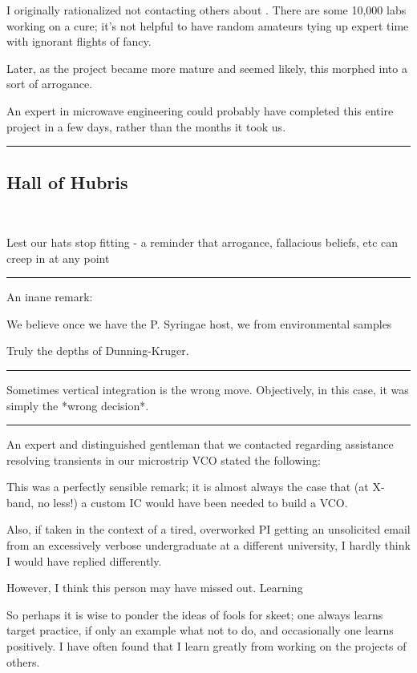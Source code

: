 \documentclass[paper.tex]{subfiles}
\begin{document}
I originally rationalized not contacting others about . There are some 10,000 labs working on a cure; it's not helpful to have random amateurs tying up expert time with ignorant flights of fancy. 

Later, as the project became more mature and seemed likely, this morphed into a sort of arrogance.

An expert in microwave engineering could probably have completed this entire project in a few days, rather than the months it took us.

\rule{\linewidth}{0.2pt}

\subsection{Hall of Hubris} \

Lest our hats stop fitting - a reminder that arrogance, fallacious beliefs, etc can creep in at any point

\rule{\linewidth}{0.2pt}

An inane remark:

\begin{displayquote}
We believe once we have the P. Syringae host, we from environmental samples
\end{displayquote}

Truly the depths of Dunning-Kruger.




\rule{\linewidth}{0.2pt}

Sometimes vertical integration is the wrong move. Objectively, in this case, it was simply the *wrong decision*. 

\rule{\linewidth}{0.2pt}


An expert and distinguished gentleman that we contacted regarding assistance resolving transients in our microstrip VCO stated the following:



This was a perfectly sensible remark; it is almost always the case that (at X-band, no less!) a custom IC would have been needed to build a VCO.

Also, if taken in the context of a tired, overworked PI getting an unsolicited email from an excessively verbose undergraduate at a different university, I hardly think I would have replied differently.

However, I think this person may have missed out. Learning 

So perhaps it is wise to ponder the ideas of fools for skeet; one always learns target practice, if only an example what not to do, and occasionally one learns positively. I have often found that I learn greatly from working on the projects of others.
\end{document}
